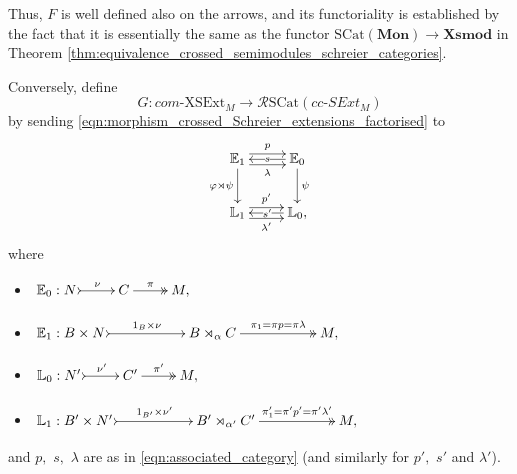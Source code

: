 \documentclass[a4paper]{amsart}
\theoremstyle{plain}
\theoremstyle{definition}
\theoremstyle{remark}
\begin{document}
Thus, $F$ is well defined also on the arrows, and its functoriality is established by the fact that it is essentially the same as the functor $\mathrm{SCat}(\mathbf{Mon})\rightarrow\mathbf{Xsmod}$ in Theorem \ref{thm:equivalence_crossed_semimodules_schreier_categories}.

Conversely, define
\begin{equation}
\label{eqn:G}
G\colon com\text{-}\mathrm{XSExt}_M\longrightarrow\mathcal{R}\mathrm{SCat}(cc\text{-}SExt_M)
\end{equation}
by sending \eqref{eqn:morphism_crossed_Schreier_extensions_factorised} to
\begin{equation*}
{\xymatrix{
{{\mathbb{E}}_1} \ar[d]_-{\varphi\rtimes\psi} \ar@<.9ex>[r]^-{p} \ar@<-.9ex>[r]_-{\lambda} &{{\mathbb{E}}_0} \ar[d]^-{\psi} \ar[l]|{s} \\
{{\mathbb{L}}_1} \ar@<.9ex>[r]^-{p'} \ar@<-.9ex>[r]_-{\lambda'} &{{\mathbb{L}}_0,} \ar[l]|{s'}
}}
\end{equation*}
where
\begin{itemize}
\item[] $\xymatrix{{{\mathbb{E}}_0:N} \ar@{>->}[r]^-{\nu} &{C} \ar@{->>}[r]^-{\pi} &{M,}}$
\item[] $\xymatrixcolsep{4.5pc}\xymatrix{{{\mathbb{E}}_1:B\times N } \ar@{>->}[r]^-{1_B\times\nu} &{B\rtimes_{\alpha}C} \ar@{->>}[r]^-{\pi_1=\pi p=\pi\lambda} &{M,}}$
\item[] $\xymatrix{{{\mathbb{L}}_0:N'} \ar@{>->}[r]^-{\nu'} &{C'} \ar@{->>}[r]^-{\pi'} &{M,}}$
\item[] $\xymatrixcolsep{4.5pc}\xymatrix{{{\mathbb{L}}_1:B'\times N'} \ar@{>->}[r]^-{1_{B'}\times\nu'} &{B'\rtimes_{\alpha'}C'} \ar@{->>}[r]^-{\pi'_1=\pi' p'=\pi'\lambda'} &{M,}}$
\end{itemize}
and $p,$ $s,$ $\lambda$ are as in \eqref{eqn:associated_category} (and similarly for $p',$ $s'$ and $\lambda'$).
\end{document}

